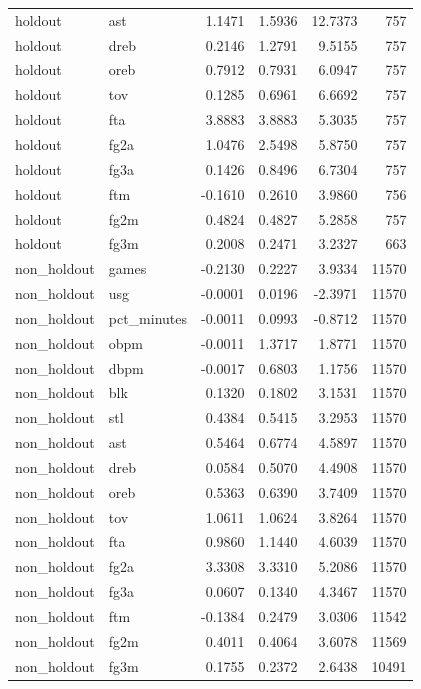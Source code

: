 \begin{table}
\begin{tabular}{llrrrr}
holdout & ast & 1.1471 & 1.5936 & 12.7373 & 757 \\
holdout & dreb & 0.2146 & 1.2791 & 9.5155 & 757 \\
holdout & oreb & 0.7912 & 0.7931 & 6.0947 & 757 \\
holdout & tov & 0.1285 & 0.6961 & 6.6692 & 757 \\
holdout & fta & 3.8883 & 3.8883 & 5.3035 & 757 \\
holdout & fg2a & 1.0476 & 2.5498 & 5.8750 & 757 \\
holdout & fg3a & 0.1426 & 0.8496 & 6.7304 & 757 \\
holdout & ftm & -0.1610 & 0.2610 & 3.9860 & 756 \\
holdout & fg2m & 0.4824 & 0.4827 & 5.2858 & 757 \\
holdout & fg3m & 0.2008 & 0.2471 & 3.2327 & 663 \\
non\_holdout & games & -0.2130 & 0.2227 & 3.9334 & 11570 \\
non\_holdout & usg & -0.0001 & 0.0196 & -2.3971 & 11570 \\
non\_holdout & pct\_minutes & -0.0011 & 0.0993 & -0.8712 & 11570 \\
non\_holdout & obpm & -0.0011 & 1.3717 & 1.8771 & 11570 \\
non\_holdout & dbpm & -0.0017 & 0.6803 & 1.1756 & 11570 \\
non\_holdout & blk & 0.1320 & 0.1802 & 3.1531 & 11570 \\
non\_holdout & stl & 0.4384 & 0.5415 & 3.2953 & 11570 \\
non\_holdout & ast & 0.5464 & 0.6774 & 4.5897 & 11570 \\
non\_holdout & dreb & 0.0584 & 0.5070 & 4.4908 & 11570 \\
non\_holdout & oreb & 0.5363 & 0.6390 & 3.7409 & 11570 \\
non\_holdout & tov & 1.0611 & 1.0624 & 3.8264 & 11570 \\
non\_holdout & fta & 0.9860 & 1.1440 & 4.6039 & 11570 \\
non\_holdout & fg2a & 3.3308 & 3.3310 & 5.2086 & 11570 \\
non\_holdout & fg3a & 0.0607 & 0.1340 & 4.3467 & 11570 \\
non\_holdout & ftm & -0.1384 & 0.2479 & 3.0306 & 11542 \\
non\_holdout & fg2m & 0.4011 & 0.4064 & 3.6078 & 11569 \\
non\_holdout & fg3m & 0.1755 & 0.2372 & 2.6438 & 10491 \\
\bottomrule
\end{tabular}
\end{table}
